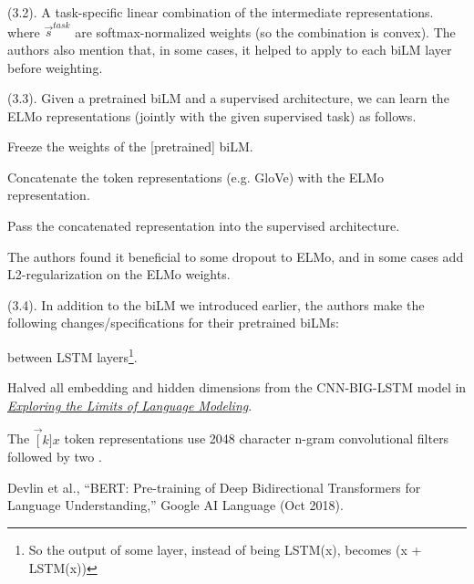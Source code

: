 \documentclass[11pt]{article}
\begin{document}
\myspace
\p {} (3.2). A task-specific linear combination of the intermediate representations. 
where $\vec{s}^{task}$ are softmax-normalized weights (so the combination is convex). The authors also mention that, in some cases, it helped to apply  to each biLM layer before weighting. 

\myspace
\p {} (3.3). Given a pretrained biLM and a supervised architecture, we can learn the ELMo representations (jointly with the given supervised task) as follows. 
\begin{compactenum}
	\item Freeze the weights of the [pretrained] biLM. 
	\item Concatenate the token representations (e.g. GloVe) with the ELMo representation. 
	\item Pass the concatenated representation into the supervised architecture. 
\end{compactenum}
The authors found it beneficial to some dropout to ELMo, and in some cases add L2-regularization on the ELMo weights.

\myspace
\p {} (3.4). In addition to the biLM we introduced earlier, the authors make the following changes/specifications for their pretrained biLMs:
\begin{compactitem}
	\item  {} between LSTM layers\footnote{So the output of some layer, instead of being LSTM(x), becomes (x + LSTM(x))}.
	
	\item Halved all embedding and hidden dimensions from the CNN-BIG-LSTM model in \href{https://arxiv.org/abs/1602.02410}{\textit{Exploring the Limits of Language Modeling}}. 
	
	\item The $\vec[k]{x}$ token representations use 2048 character n-gram convolutional filters followed by two . 
\end{compactitem}






\vspace{-1em}
{\footnotesize Devlin et al., ``BERT: Pre-training of Deep Bidirectional Transformers for Language Understanding,''  Google AI Language (Oct 2018).}
\end{document}
